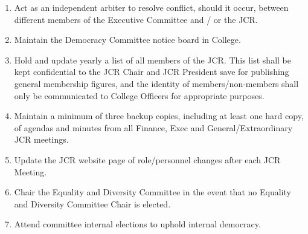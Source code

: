\begin{enumerate}
    \item Act as an independent arbiter to resolve conflict, should it occur, between different members of the Executive Committee and / or the JCR.
    \item Maintain the Democracy Committee notice board in College.
    \item Hold and update yearly a list of all members of the JCR. This list shall be kept confidential to the JCR Chair and JCR President save for publishing general membership figures, and the identity of members/non-members shall only be communicated to College Officers for appropriate purposes.
    \item Maintain a minimum of three backup copies, including at least one hard copy, of agendas and minutes from all Finance, Exec and General/Extraordinary JCR meetings. 
    \item Update the JCR website page of role/personnel changes after each JCR Meeting.
    \item Chair the Equality and Diversity Committee in the event that no Equality and Diversity Committee Chair is elected.
    \item Attend committee internal elections to uphold internal democracy.
\end{enumerate}

